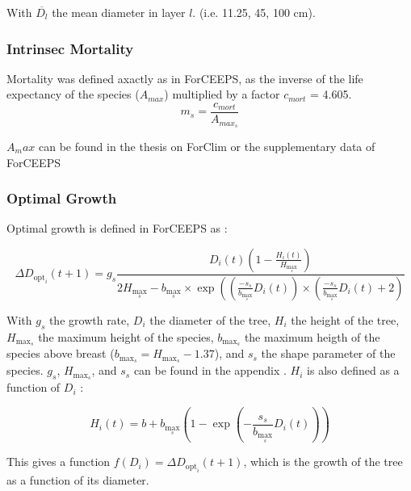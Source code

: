 \documentclass{article}
\begin{document}
With $\overline{D_{l}}$ the mean diameter in layer $l$. (i.e. 11.25, 45, 100 cm).\\

\subsubsection{Intrinsec Mortality}

Mortality was defined axactly as in ForCEEPS, as the inverse of the life expectancy of the species ($A_{max}$) multiplied by a factor $c_{mort}$ = 4.605.
\begin{equation}
    m_s = \frac{c_{mort}}{A_{max_s}}
\end{equation}

$A_max$ can be found in the thesis on ForClim \autocite{bugmannEcologyMountainousForests1965} or the supplementary data of ForCEEPS \autocite{morinForestSuccessionGap2021}

\subsubsection{Optimal Growth}

Optimal growth is defined in ForCEEPS \autocite{morinForestSuccessionGap2021} as :

\begin{equation}
    \Delta D_{\mathrm{opt}_i}(t+1)=g_s \frac{D_i(t)\left(1-\frac{H_i(t)}{H_{\max _s}}\right)}{2 H_{\max _s}-b_{\max _s} \times \exp \left(\left(\frac{-s_s}{b_{\max _s}} D_i(t)\right) \times\left(\frac{-s_s}{b_{\max _s}} D_i(t)+2\right)\right.}
\end{equation}

With $g_s$ the growth rate, $D_i$ the diameter of the tree, $H_i$ the height of the tree, $H_{\max _s}$ the maximum height of the species, $b_{\max _s}$ the maximum heigth of the species above breast ($b_{\max _s} =  H_{\max _s} - 1.37$), and $s_s$ the shape parameter of the species. $g_s$, $H_{\max _s}$, and $s_s$ can be found in the appendix \autocite{morinForestSuccessionGap2021}. $H_i$ is also defined as a function of $D_i$ :

\begin{equation}
    H_i(t)=b+b_{\max _s}\left(1-\exp \left(-\frac{s_s}{b_{\max _s}} D_i(t)\right)\right)
    \label{eq:height}
\end{equation}

This gives a function $f(D_i) = \Delta D_{\mathrm{opt}_i}(t+1)$, which is the growth of the tree as a function of its diameter.
\end{document}
